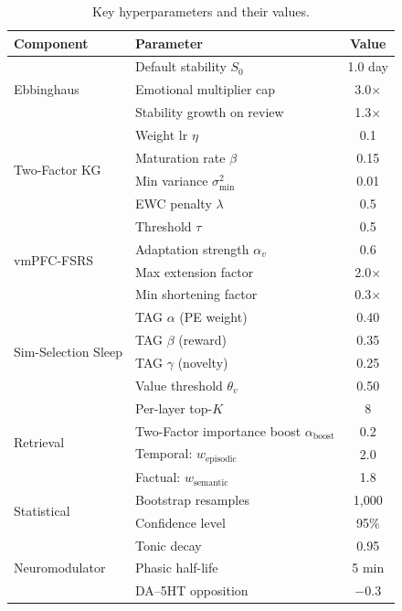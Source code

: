 \documentclass{article}
\begin{document}
\begin{table}[h]
    \centering
    \caption{Key hyperparameters and their values.}
    \begin{tabular}{llc}
        \toprule
        Component & Parameter & Value \\
        \midrule
        \multirow{3}{*}{Ebbinghaus} & Default stability $S_0$ & 1.0 day \\
        & Emotional multiplier cap & 3.0$\times$ \\
        & Stability growth on review & 1.3$\times$ \\
        \midrule
        \multirow{4}{*}{Two-Factor KG} & Weight lr $\eta$ & 0.1 \\
        & Maturation rate $\beta$ & 0.15 \\
        & Min variance $\sigma^2_{\min}$ & 0.01 \\
        & EWC penalty $\lambda$ & 0.5 \\
        \midrule
        \multirow{4}{*}{vmPFC-FSRS} & Threshold $\tau$ & 0.5 \\
        & Adaptation strength $\alpha_v$ & 0.6 \\
        & Max extension factor & 2.0$\times$ \\
        & Min shortening factor & 0.3$\times$ \\
        \midrule
        \multirow{4}{*}{Sim-Selection Sleep} & TAG $\alpha$ (PE weight) & 0.40 \\
        & TAG $\beta$ (reward) & 0.35 \\
        & TAG $\gamma$ (novelty) & 0.25 \\
        & Value threshold $\theta_v$ & 0.50 \\
        \midrule
        \multirow{4}{*}{Retrieval} & Per-layer top-$K$ & 8 \\
        & Two-Factor importance boost $\alpha_{\mathrm{boost}}$ & 0.2 \\
        & Temporal: $w_{\text{episodic}}$ & 2.0 \\
        & Factual: $w_{\text{semantic}}$ & 1.8 \\
        \midrule
        \multirow{2}{*}{Statistical} & Bootstrap resamples & 1{,}000 \\
        & Confidence level & 95\% \\
        \midrule
        \multirow{4}{*}{Neuromodulator} & Tonic decay & 0.95 \\
        & Phasic half-life & 5 min \\
        & DA--5HT opposition & $-$0.3 \\

\end{tabular}
\end{table}
\end{document}

